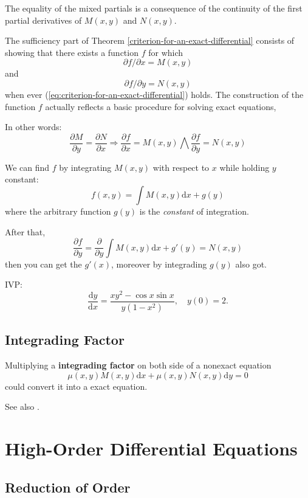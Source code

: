 \documentclass{beaulivre}
\begin{document}
The equality of the mixed partials is a consequence of 
the continuity of the first partial derivatives of $M(x, y)$ and $N(x, y)$.

The sufficiency part of Theorem \ref{criterion-for-an-exact-differential} 
consists of showing that there exists a function $f$ for which
\[\partial f/ \partial x = M(x, y)\] and \[\partial f/ \partial y = N(x, y)\]
when ever (\ref{eq:criterion-for-an-exact-differential}) holds.
The construction of the function $f$ actually reflects a basic procedure
for solving exact equations,

In other words:
\[
    \dfrac{\partial M}{\partial y} = \dfrac{\partial N}{\partial x}  
    \Longrightarrow 
    \dfrac{\partial f}{\partial x} = M(x, y) 
    \bigwedge
    \dfrac{\partial f}{\partial y} = N(x, y) 
\]

We can find $f$ by integrating $M(x, y)$ 
with respect to $x$ while holding $y$ constant:
\[
    f(x, y) = \int M(x, y) \mathrm{d}x + g(y)
\]
where the arbitrary function $g(y)$ is the \emph{constant} of integration. 

After that, 
\[
    \dfrac{\partial f}{\partial y} = \dfrac{\partial}{\partial y}
    \int M(x, y) \mathrm{d}x + g'(y) = N(x, y)
\]
then you can get the $g'(x)$, moreover by integrading $g(y)$ also got.

\begin{example}
    IVP:
    \[
        \dfrac{\mathrm{d}y}{\mathrm{d}x} = 
        \dfrac{xy^2 - \cos x \sin x}{y(1-x^2)}, \quad y(0) = 2.
    \]
    \cite[page 68]{fcde}
\end{example}

\subsection{Integrading Factor}

Multiplying a \textbf{integrading factor} on both side of a nonexact equation
\[
    \mu (x, y) M(x, y) \mathrm{d}x + \mu (x, y) N(x, y) \mathrm{d}y = 0
\]
could convert it into a exact equation.

See also \cite[page 68]{fcde}.

\section{High-Order Differential Equations}

\subsection{Reduction of Order} \label{reduction-of-order}
\end{document}
